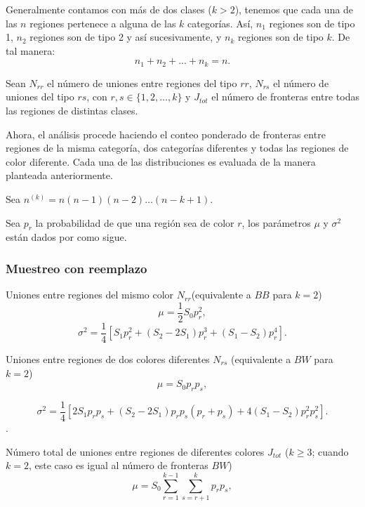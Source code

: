 Generalmente contamos con más de dos clases ($k > 2$), tenemos que cada una de las $n$ regiones pertenece a alguna de las $k$ categorías. Así, $n_{1}$ regiones son de tipo 1, $n_{2}$ regiones son de tipo 2 y así sucesivamente, y $n_{k}$ regiones son de tipo $k$. De tal manera:
\begin{equation}
n_{1}+n_{2}+...+n_{k}=n.
\end{equation}

Sean $N_{rr}$ el número de uniones entre regiones del tipo $rr$,  $N_{rs}$ el número de uniones del tipo $rs$, con  $r,s \in \{1,2, \dots, k\}$ y $J_{tot}$ el número de fronteras entre todas las regiones de distintas clases. 


Ahora, el análisis procede haciendo el conteo ponderado de fronteras entre regiones de la misma categoría, dos categorías diferentes y todas las regiones de color diferente. Cada una de las distribuciones es evaluada de la manera planteada anteriormente.

Sea $n^{(k)}=n(n-1)(n-2)\dots(n-k+1)$.

Sea $p_r$ la probabilidad de que una región sea de color $r$, los parámetros $\mu$ y $\sigma^2$ están dados por \citet{moran48} como sigue.


\subsubsection*{Muestreo con reemplazo}
Uniones entre regiones del mismo color $N_{rr}$(equivalente a $BB$ para $k=2$)
\begin{equation}
\mu = \dfrac{1}{2} S_0 p_r^2,
\end{equation}
\begin{equation}
\sigma^2 = \dfrac{1}{4} \left[ S_1 p_r^2 + (S_2-2S_1)p_r^3 + (S_1-S_2)p_r^4 \right] .
\end{equation}

Uniones entre regiones de dos colores diferentes $N_{rs}$ (equivalente a $BW$ para $k=2$)
\begin{equation}
\mu = S_0 p_r p_s,
\end{equation}

\begin{equation}
\sigma^2 = \dfrac{1}{4} \left[ 2S_1 p_r p_s + (S_2-2S_1)p_r p_s(p_r+p_s) + 4(S_1-S_2)p_r^2 p_s^2 \right] .
\end{equation}.

Número total de uniones entre regiones de diferentes colores $J_{tot}$ ($k \geq 3$; cuando $k=2$, este caso es igual al número de fronteras $BW$)
\begin{equation}
 \mu = S_0 \sum_{r=1}^{k-1} \sum_{s=r+1}^{k} p_r p_s,
\end{equation}

